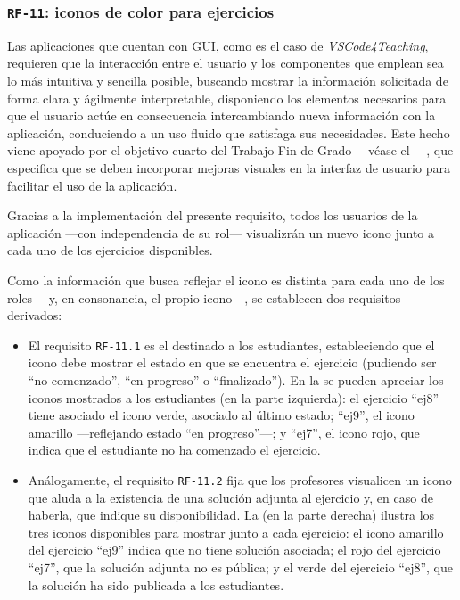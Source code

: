 \subsubsection{\texttt{RF-11}: iconos de color para ejercicios}
\label{subsec:rf11}

Las aplicaciones que cuentan con GUI, como es el caso de \textit{VSCode4Teaching}, requieren que la interacción entre el usuario y los componentes que emplean sea lo más intuitiva y sencilla posible, buscando mostrar la información solicitada de forma clara y ágilmente interpretable, disponiendo los elementos necesarios para que el usuario actúe en consecuencia intercambiando nueva información con la aplicación, conduciendo a un uso fluido que satisfaga sus necesidades. Este hecho viene apoyado por el objetivo cuarto del Trabajo Fin de Grado ---véase el ---, que especifica que se deben incorporar mejoras visuales en la interfaz de usuario para facilitar el uso de la aplicación.

Gracias a la implementación del presente requisito, todos los usuarios de la aplicación ---con independencia de su rol--- visualizrán un nuevo icono junto a cada uno de los ejercicios disponibles.

Como la información que busca reflejar el icono es distinta para cada uno de los roles ---y, en consonancia, el propio icono---, se establecen dos requisitos derivados:
\begin{itemize}
    \item El requisito \texttt{RF-11.1} es el destinado a los estudiantes, estableciendo que el icono debe mostrar el estado en que se encuentra el ejercicio (pudiendo ser ``no comenzado'', ``en progreso'' o ``finalizado''). En la  se pueden apreciar los iconos mostrados a los estudiantes (en la parte izquierda): el ejercicio ``ej8'' tiene asociado el icono verde, asociado al último estado; ``ej9'', el icono amarillo ---reflejando estado ``en progreso''---; y ``ej7'', el icono rojo, que indica que el estudiante no ha comenzado el ejercicio.
    \item Análogamente, el requisito \texttt{RF-11.2} fija que los profesores visualicen un icono que aluda a la existencia de una solución adjunta al ejercicio y, en caso de haberla, que indique su disponibilidad. La  (en la parte derecha) ilustra los tres iconos disponibles para mostrar junto a cada ejercicio: el icono amarillo del ejercicio ``ej9'' indica que no tiene solución asociada; el rojo del ejercicio ``ej7'', que la solución adjunta no es pública; y el verde del ejercicio ``ej8'', que la solución ha sido publicada a los estudiantes.
\end{itemize}

